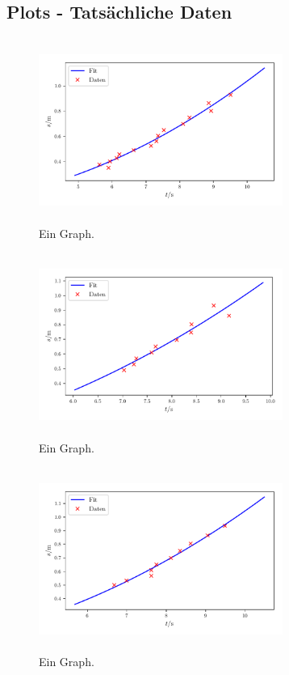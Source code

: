 \subsection{Plots - Tatsächliche Daten}
\begin{frame}
    \begin{figure}   
    
    \centering
    \includegraphics[width=8cm, height=6cm]{build/plot1a.pdf}
    \caption{Ein Graph.} 

    \label{fig:plot1a}
\end{figure}
\end{frame}

\begin{frame}
    \begin{figure}   
    
    \centering
    \includegraphics[width=8cm, height=6cm]{build/plot2a.pdf}
    \caption{Ein Graph.} 

    \label{fig:plot2a}
\end{figure}
\end{frame}

\begin{frame}
    \begin{figure}   
    
    \centering
    \includegraphics[width=8cm, height=6cm]{build/plot3a.pdf}
    \caption{Ein Graph.} 

    \label{fig:plot3a}
\end{figure}
\end{frame}

